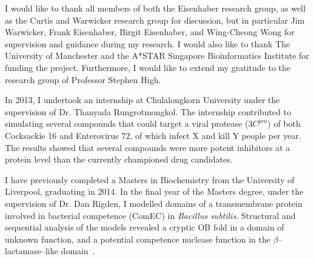 \documentclass[12pt,PhD,twoside]{muthesis}
\begin{document}
I would like to thank all members of both the Eisenhaber research group, as well as the Curtis and Warwicker research group for discussion, but in particular Jim Warwicker, Frank Eisenhaber, Birgit Eisenhaber, and Wing-Cheong Wong for supervision and guidance during my research. I would also like to thank The University of Manchester and the A*STAR Singapore Bioinformatics Institute for funding the project. Furthermore, I would like to extend my gratitude to the research group of Professor Stephen High.


In 2013, I undertook an internship at Chulalongkorn University under the supervision of Dr. Thanyada Rungrotmongkol. The internship contributed to simulating several compounds that could target a viral protease (\(3C^{pro}\)) of both Cocksackie 16 and Enterovirus 72, of which infect X and kill Y people per year. The results showed that several compounds were more potent inhibitors at a protein level than the currently championed drug candidates.

I have previously completed a Masters in Biochemistry from the University of Liverpool, graduating in 2014. In the final year of the Masters degree, under the supervision of Dr. Dan Rigden, I modelled domains of a transmembrane protein involved in bacterial competence (ComEC) in \textit{Bacillus subtilis}. Structural and sequential analysis of the models revealed a cryptic OB fold in a domain of unknown function, and a potential competence nuclease function in the $\beta$--lactamase--like domain~\cite{Baker2016}.


\end{document}
